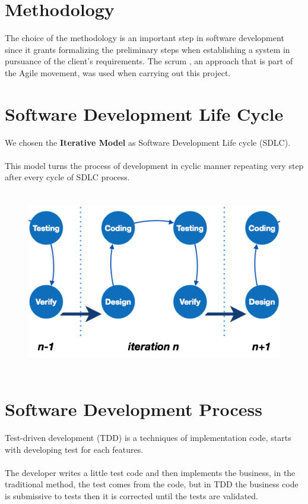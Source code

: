 	\section{Methodology}
	The choice of the methodology is an important step in software development since it grants formalizing the preliminary steps when establishing a system in pursuance of the client’s requirements.
	The scrum , an approach that is part of the Agile movement, was used when carrying out this project.
	
	\newpage
	
	\section{Software Development Life Cycle}
	We chosen the \textbf{Iterative Model }as Software Development Life cycle (SDLC).
	\\
	\\
	This model turns the process of development in cyclic manner repeating very step after every cycle of SDLC process. 
	
	\begin{figure}[h]
		\centering
		\includegraphics[width=14cm,height=8cm]{sdlc_iterative.png}
		\label{sdlc_iterative}
		
	\end{figure}  

	\newpage

	\section{Software Development Process}
	Test-driven development (TDD) is a techniques of implementation code, starts with developing test for each features. 
	\\
	\\
	The developer writes a little test code and then implements the business, in the traditional method, the test comes from the code, but in TDD the business code is submissive to tests then it is corrected until the tests are validated. 
	
